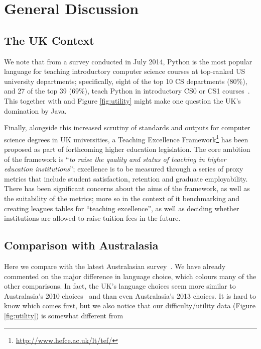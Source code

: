 \documentclass{sig-alternate}
\begin{document}
\section{General Discussion}\label{discussion}

\subsection{The UK Context}

We note that from a survey conducted in July 2014, Python is the most
popular language for teaching introductory computer science courses at
top-ranked US university departments; specifically, eight of the top
10 CS departments (80\%), and 27 of the top 39 (69\%), teach Python in
introductory CS0 or CS1 courses~\cite{guo:2014}. This together with \cite{mason+cooper:2014} and Figure \ref{fig:utility} might make one question the UK's domination by Java.

Finally, alongside this increased scrutiny of standards and outputs
for computer science degrees in UK universities, a Teaching Excellence
Framework\footnote{\url{http://www.hefce.ac.uk/lt/tef/}} has been
proposed as part of forthcoming higher education legislation. The core
ambition of the framework is ``{\emph{to raise the quality and status
of teaching in higher education institutions}}''; excellence is to be
measured through a series of proxy metrics that include student
satisfaction, retention and graduate employability. There has been
significant concerns about the aims of the framework, as well as the
suitability of the metrics; more so in the context of it benchmarking
and creating leagues tables for ``teaching excellence'', as well as
deciding whether institutions are allowed to raise tuition fees in the
future.

\subsection{Comparison with Australasia}

Here we compare with the latest Australasian
survey~\cite{mason+cooper:2014}. We have already commented on the
major difference in language choice, which colours many of the other
comparisons. In fact, the UK's language choices seem more similar to
Australasia's 2010 choices~\cite{mason-et-al:2012} and \cite[Table
4]{mason+cooper:2014} than even Australasia's 2013 choices. It is hard
to know which comes first, but we also notice that our
difficulty/utility data (Figure \ref{fig:utility}) is somewhat
different from \cite[Figures 7/8]{mason+cooper:2014}
\end{document}
